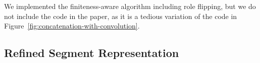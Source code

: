 We implemented the finiteness-aware algorithm including role flipping,
but we do not include the code in the paper, as it is a
tedious variation of the code in
Figure~\ref{fig:concatenation-with-convolution}. 





\subsection{Refined Segment Representation}
\label{sec:segm-repr}

